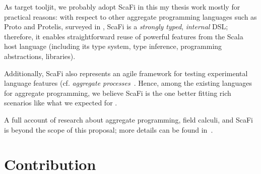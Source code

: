 \documentclass[11pt]{article}
\begin{document}
As target tooljit, we probably adopt ScaFi in this my thesis work mostly for practical reasons: with respect to other aggregate programming languages such as Proto and Protelis, surveyed in \cite{viroli2019jlamp-si-coord},
ScaFi is a \emph{strongly typed}, \emph{internal} DSL; therefore, it enables straightforward reuse of powerful features from the Scala host language (including its type system, type inference, programming abstractions, libraries).

Additionally, ScaFi also represents an agile framework for testing experimental language features (cf. \emph{aggregate processes}~\cite{DBLP:journals/eaai/CasadeiVAPD21}.
%
Hence, among the existing languages for aggregate programming, we believe ScaFi is the one better fitting rich scenarios like what we expected for \cpws.

A full account of research about aggregate programming, field calculi, and ScaFi is beyond the scope of this proposal; more details can be found in~\cite{viroli2019jlamp-si-coord,DBLP:journals/eaai/CasadeiVAPD21}.

\section{Contribution} \label{contribution}
\end{document}
